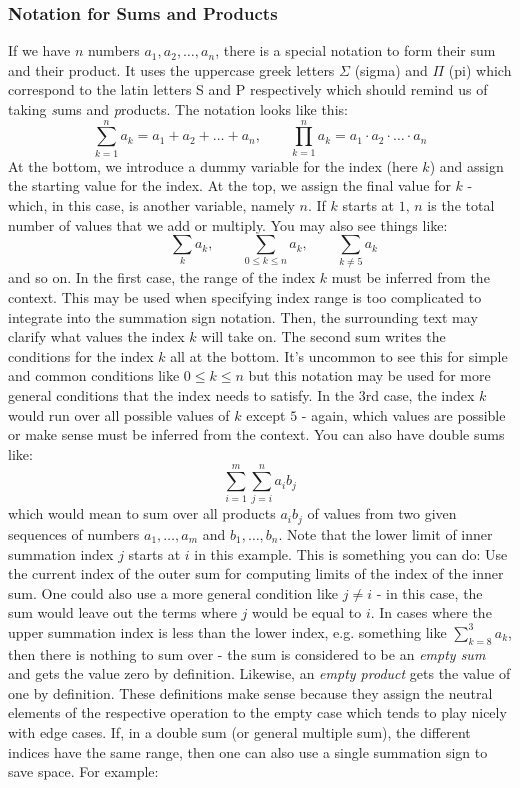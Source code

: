 \subsubsection{Notation for Sums and Products}
\label{Sec:SumsAndProducts}
If we have $n$ numbers $a_1, a_2, \ldots, a_n$, there is a special notation to form their sum and their product. It uses the uppercase greek letters $\Sigma$ (sigma) and $\Pi$ (pi) which correspond to the latin letters S and P respectively which should remind us of taking \emph{s}ums and \emph{p}roducts. The notation looks like this:
\begin{equation}
 \sum_{k=1}^{n}  a_k = a_1   +   a_2   +   \ldots   +   a_n, \qquad
 \prod_{k=1}^{n} a_k = a_1 \cdot a_2 \cdot \ldots \cdot a_n 
\end{equation}
At the bottom, we introduce a dummy variable for the index (here $k$) and assign the starting value for the index. At the top, we assign the final value for $k$ - which, in this case, is another variable, namely $n$. If $k$ starts at $1$, $n$ is the total number of values that we add or multiply. You may also see things like:
\begin{equation}
 \qquad  \sum_{k} a_k,       \qquad
 \sum_{0 \leq k \leq n} a_k, \qquad
 \sum_{k \neq 5} a_k
\end{equation}
and so on. In the first case, the range of the index $k$ must be inferred from the context. This may be used when specifying index range is too complicated to integrate into the summation sign notation. Then, the surrounding text may clarify what values the index $k$ will take on. The second sum writes the conditions for the index $k$ all at the bottom. It's  uncommon to see this for simple and common conditions like $0 \leq k \leq n$ but this notation may be used for more general conditions that the index needs to satisfy. In the 3rd case, the index $k$ would run over all possible values of $k$ except $5$ - again, which values are possible or make sense must be inferred from the context. You can also have double sums like:
\begin{equation}
 \sum_{i=1}^{m} \sum_{j=i}^n  a_i b_j
\end{equation}
which would mean to sum over all products $a_i b_j$ of values from two given sequences of numbers $a_1,\ldots,a_m$ and $b_1,\ldots,b_n$. Note that the lower limit of inner summation index $j$ starts at $i$ in this example. This is something you can do: Use the current index of the outer sum for computing limits of the index of the inner sum. One could also use a more general condition like $j \neq i$ - in this case, the sum would leave out the terms where $j$ would be equal to $i$. In cases where the upper summation index is less than the lower index, e.g. something like $\sum_{k=8}^{3} a_k$, then there is nothing to sum over - the sum is considered to be an \emph{empty sum} and gets the value zero by definition. Likewise, an \emph{empty product} gets the value of one by definition. These definitions make sense because they assign the neutral elements of the respective operation to the empty case which tends to play nicely with edge cases. If, in a double sum (or general multiple sum), the different indices have the same range, then one can also use a single summation sign to save space. For example:
